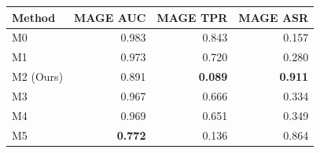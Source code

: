 \begin{tabular}{lrrr}
\toprule
Method & MAGE AUC & MAGE TPR & MAGE ASR \\
\midrule
M0 & 0.983 & 0.843 & 0.157 \\
M1 & 0.973 & 0.720 & 0.280 \\
M2 (Ours) & 0.891 & \textbf{0.089} & \textbf{0.911} \\
M3 & 0.967 & 0.666 & 0.334 \\
M4 & 0.969 & 0.651 & 0.349 \\
M5 & \textbf{0.772} & 0.136 & 0.864 \\
\bottomrule
\end{tabular}
